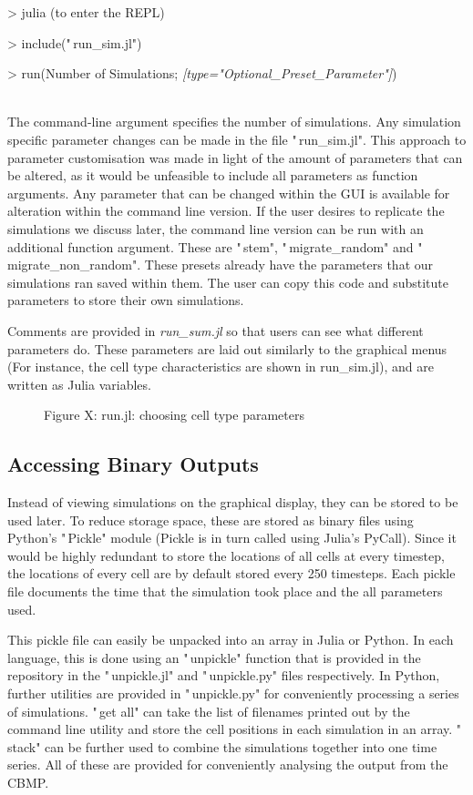 \documentclass[12pt]{article}
\begin{document}
{\fontsize{11pt}{11pt} \ttfamily 
> julia (to enter the REPL)

> include("\,run\_sim.jl")

> run(Number of Simulations; {\itshape[type="Optional\_Preset\_Parameter"]})}\\

The command-line argument specifies the number of simulations. Any 
simulation specific parameter changes can be made in the file 
"\,run\_sim.jl". This approach to parameter customisation was made in 
light of the amount of parameters that can be altered, as it would be 
unfeasible to include all parameters as function arguments. Any 
parameter that can be changed within the GUI is available for alteration 
within the command line version. If the user desires to replicate the 
simulations we discuss later, the command line version can be run with 
an additional function argument. These are "\,stem", "\,migrate\_random" 
and "\,migrate\_non\_random". These presets already have the parameters 
that our simulations ran saved within them. The user can copy this code 
and substitute parameters to store their own simulations.

Comments are provided in {\itshape run\_sum.jl} so that users can see 
what different parameters do. These parameters are laid out similarly to 
the graphical menus (For instance, the cell type characteristics are 
shown in run\_sim.jl), and are written as Julia variables.

\begin{figure}[H]
\centering
\caption{Figure X: run.jl: choosing cell type parameters}
\end{figure}

\subsection{Accessing Binary Outputs}
Instead of viewing simulations on the graphical display, they can be 
stored to be used later. To reduce storage space, these are stored as 
binary files using Python's "\,Pickle" module (Pickle is in turn called 
using Julia's PyCall). Since it would be highly redundant to store the 
locations of all cells at every timestep, the locations of every cell 
are by default stored every 250 timesteps. Each pickle file documents 
the time that the simulation took place and the all parameters used.

This pickle file can easily be unpacked into an array in Julia or 
Python. In each language, this is done using an "\,unpickle" function 
that is provided in the repository in the "\,unpickle.jl" and 
"\,unpickle.py" files respectively. In Python, further utilities are 
provided in "\,unpickle.py" for conveniently processing a series of 
simulations. "\,get all" can take the list of filenames printed out by 
the command line utility and store the cell positions in each simulation 
in an array. "\,stack" can be further used to combine the simulations 
together into one time series. All of these are provided for 
conveniently analysing the output from the CBMP.
\end{document}
